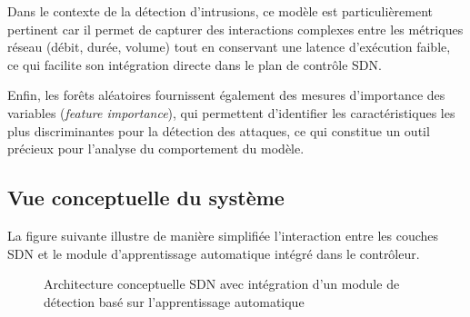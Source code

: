 \documentclass[11pt]{article}
\begin{document}
Dans le contexte de la détection d’intrusions, ce modèle est particulièrement pertinent car il permet de capturer des interactions complexes entre les métriques réseau (débit, durée, volume) tout en conservant une latence d’exécution faible, ce qui facilite son intégration directe dans le plan de contrôle SDN.

Enfin, les forêts aléatoires fournissent également des mesures d’importance des variables (\textit{feature importance}), qui permettent d’identifier les caractéristiques les plus discriminantes pour la détection des attaques, ce qui constitue un outil précieux pour l’analyse du comportement du modèle.

\subsection{Vue conceptuelle du système}

La figure suivante illustre de manière simplifiée l’interaction entre les couches SDN et le module d’apprentissage automatique intégré dans le contrôleur.

\begin{figure}[h]
\centering
{}
\caption{Architecture conceptuelle SDN avec intégration d’un module de détection basé sur l’apprentissage automatique}
\end{figure}

\medskip
\end{document}
